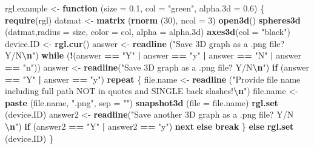 \documentclass[
]{book}
\newenvironment{Shaded}{\begin{snugshade}}{\end{snugshade}}
\newcommand{\AttributeTok}[1]{\textcolor[rgb]{0.13,0.29,0.53}{#1}}
\newcommand{\ControlFlowTok}[1]{\textcolor[rgb]{0.13,0.29,0.53}{\textbf{#1}}}
\newcommand{\DecValTok}[1]{\textcolor[rgb]{0.00,0.00,0.81}{#1}}
\newcommand{\FloatTok}[1]{\textcolor[rgb]{0.00,0.00,0.81}{#1}}
\newcommand{\FunctionTok}[1]{\textcolor[rgb]{0.13,0.29,0.53}{\textbf{#1}}}
\newcommand{\NormalTok}[1]{#1}
\newcommand{\OtherTok}[1]{\textcolor[rgb]{0.56,0.35,0.01}{#1}}
\newcommand{\SpecialCharTok}[1]{\textcolor[rgb]{0.81,0.36,0.00}{\textbf{#1}}}
\newcommand{\StringTok}[1]{\textcolor[rgb]{0.31,0.60,0.02}{#1}}
\begin{document}
\begin{Shaded}
\begin{Highlighting}[]
\NormalTok{rgl.example }\OtherTok{\textless{}{-}} \ControlFlowTok{function}\NormalTok{ (}\AttributeTok{size =} \FloatTok{0.1}\NormalTok{, }\AttributeTok{col =} \StringTok{"green"}\NormalTok{, }\AttributeTok{alpha.3d =} \FloatTok{0.6}\NormalTok{) }
\NormalTok{\{ }\FunctionTok{require}\NormalTok{(rgl)}
\NormalTok{  datmat }\OtherTok{\textless{}{-}} \FunctionTok{matrix}\NormalTok{ (}\FunctionTok{rnorm}\NormalTok{ (}\DecValTok{30}\NormalTok{), }\AttributeTok{ncol =} \DecValTok{3}\NormalTok{)}
  \FunctionTok{open3d}\NormalTok{()}
  \FunctionTok{spheres3d}\NormalTok{ (datmat,}\AttributeTok{radius =}\NormalTok{ size, }\AttributeTok{color =}\NormalTok{ col, }\AttributeTok{alpha =}\NormalTok{ alpha}\FloatTok{.3}\NormalTok{d)}
  \FunctionTok{axes3d}\NormalTok{(}\AttributeTok{col =} \StringTok{"black"}\NormalTok{)}
\NormalTok{  device.ID }\OtherTok{\textless{}{-}} \FunctionTok{rgl.cur}\NormalTok{()}
\NormalTok{  answer }\OtherTok{\textless{}{-}} \FunctionTok{readline}\NormalTok{ (}\StringTok{"Save 3D graph as a .png file? Y/N}\SpecialCharTok{\textbackslash{}n}\StringTok{"}\NormalTok{)}
  \ControlFlowTok{while}\NormalTok{ (}\SpecialCharTok{!}\NormalTok{(answer }\SpecialCharTok{==} \StringTok{"Y"} \SpecialCharTok{|}\NormalTok{ answer }\SpecialCharTok{==} \StringTok{"y"} \SpecialCharTok{|}\NormalTok{ answer }\SpecialCharTok{==} \StringTok{"N"} \SpecialCharTok{|}\NormalTok{ answer }\SpecialCharTok{==} \StringTok{"n"}\NormalTok{)) }
\NormalTok{    answer }\OtherTok{\textless{}{-}} \FunctionTok{readline}\NormalTok{(}\StringTok{"Save 3D graph as a .png file? Y/N}\SpecialCharTok{\textbackslash{}n}\StringTok{"}\NormalTok{)}
  \ControlFlowTok{if}\NormalTok{ (answer }\SpecialCharTok{==} \StringTok{"Y"} \SpecialCharTok{|}\NormalTok{ answer }\SpecialCharTok{==} \StringTok{"y"}\NormalTok{) }
    \ControlFlowTok{repeat} 
\NormalTok{    \{ file.name }\OtherTok{\textless{}{-}} \FunctionTok{readline}\NormalTok{ (}\StringTok{"Provide file name including full }
\StringTok{                              path NOT in quotes and SINGLE }
\StringTok{                              back slashes!}\SpecialCharTok{\textbackslash{}n}\StringTok{"}\NormalTok{)}
\NormalTok{      file.name }\OtherTok{\textless{}{-}} \FunctionTok{paste}\NormalTok{ (file.name, }\StringTok{".png"}\NormalTok{, }\AttributeTok{sep =} \StringTok{""}\NormalTok{)}
      \FunctionTok{snapshot3d}\NormalTok{ (}\AttributeTok{file =}\NormalTok{ file.name)}
      \FunctionTok{rgl.set}\NormalTok{ (device.ID)}
\NormalTok{      answer2 }\OtherTok{\textless{}{-}} \FunctionTok{readline}\NormalTok{(}\StringTok{"Save another 3D graph as a .png file? Y/N }\SpecialCharTok{\textbackslash{}n}\StringTok{"}\NormalTok{)}
      \ControlFlowTok{if}\NormalTok{ (answer2 }\SpecialCharTok{==} \StringTok{"Y"} \SpecialCharTok{|}\NormalTok{ answer2 }\SpecialCharTok{==} \StringTok{"y"}\NormalTok{) }\ControlFlowTok{next} \ControlFlowTok{else} \ControlFlowTok{break}
\NormalTok{    \}}
  \ControlFlowTok{else} \FunctionTok{rgl.set}\NormalTok{ (device.ID)}
\NormalTok{\}}
\end{Highlighting}
\end{Shaded}
\end{document}
